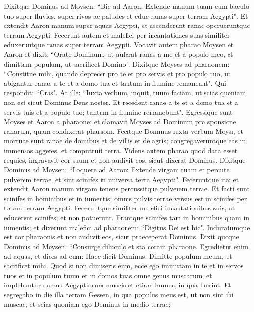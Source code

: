 \begin{biblechapter}  
\verse Dixitque Dominus ad Moysen: “Dic ad Aaron: Extende manum tuam cum baculo tuo super fluvios, super rivos ac paludes et educ ranas super terram Aegypti". 
\verse Et extendit Aaron manum super aquas Aegypti, et ascenderunt ranae operueruntque terram Aegypti. 
\verse Fecerunt autem et malefici per incantationes suas similiter eduxeruntque ranas super terram Aegypti. 
\verse Vocavit autem pharao Moysen et Aaron et dixit: “Orate Dominum, ut auferat ranas a me et a populo meo, et dimittam populum, ut sacrificet Domino". 
\verse Dixitque Moyses ad pharaonem: “Constitue mihi, quando deprecer pro te et pro servis et pro populo tuo, ut abigantur ranae a te et a domo tua et tantum in flumine remaneant". 
\verse Qui respondit: “Cras". At ille: “Iuxta verbum, inquit, tuum faciam, ut scias quoniam non est sicut Dominus Deus noster. 
\verse Et recedent ranae a te et a domo tua et a servis tuis et a populo tuo; tantum in flumine remanebunt". 
\verse Egressique sunt Moyses et Aaron a pharaone; et clamavit Moyses ad Dominum pro sponsione ranarum, quam condixerat pharaoni.  
\verse Fecitque Dominus iuxta verbum Moysi, et mortuae sunt ranae de domibus et de villis et de agris; 
\verse congregaveruntque eas in immensos aggeres, et computruit terra. 
\verse Videns autem pharao quod data esset requies, ingravavit cor suum et non audivit eos, sicut dixerat Dominus. 
\verse Dixitque Dominus ad Moysen: “Loquere ad Aaron: Extende virgam tuam et percute pulverem terrae, et sint scinifes in universa terra Aegypti". 
\verse Feceruntque ita; et extendit Aaron manum virgam tenens percussitque pulverem terrae. Et facti sunt scinifes in hominibus et in iumentis; omnis pulvis terrae versus est in scinifes per totam terram Aegypti. 
\verse Feceruntque similiter malefici incantationibus suis, ut educerent scinifes; et non potuerunt. Erantque scinifes tam in hominibus quam in iumentis; 
\verse et dixerunt malefici ad pharaonem: “Digitus Dei est hic". Induratumque est cor pharaonis et non audivit eos, sicut praeceperat Dominus. 
\verse Dixit quoque Dominus ad Moysen: “Consurge diluculo et sta coram pharaone. Egredietur enim ad aquas, et dices ad eum: Haec dicit Dominus: Dimitte populum meum, ut sacrificet mihi. 
\verse Quod si non dimiseris eum, ecce ego immittam in te et in servos tuos et in populum tuum et in domos tuas omne genus muscarum; et implebuntur domus Aegyptiorum muscis et etiam humus, in qua fuerint. 
\verse Et segregabo in die illa terram Gessen, in qua populus meus est, ut non sint ibi muscae, et scias quoniam ego Dominus in medio terrae; 

\end{biblechapter}
